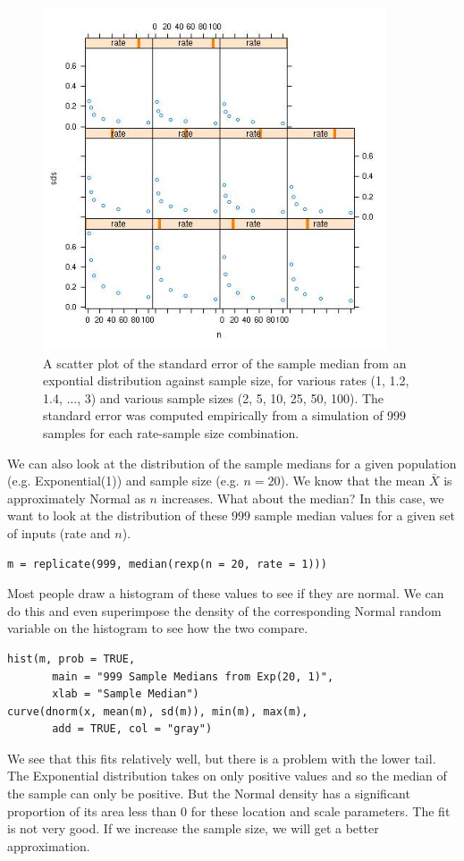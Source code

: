 \begin{figure}[htbp]
  \begin{center}
    \leavevmode
     \includegraphics[width=4in]{RNG/images/medianSDpanel.jpg}    
     \caption{A scatter plot of the standard error of the sample
       median from an expontial distribution against sample size, for
       various rates (1, 1.2, 1.4, $\ldots$, 3) and various sample
       sizes (2, 5, 10, 25, 50, 100).  The standard error was computed
       empirically from a simulation of 999 samples for each
       rate-sample size combination.}
    \label{fig:medianSD}
  \end{center}
\end{figure}

We can also look at the distribution of the sample medians for a given
population (e.g. Exponential(1)) and sample size (e.g. $n = 20$).  We
know that the mean $\bar{X}$ is approximately Normal as $n$
increases. What about the median?  In this case, we want to look at
the distribution of these $999$ sample median values for a given set
of inputs (rate and $n$).
\begin{verbatim}
m = replicate(999, median(rexp(n = 20, rate = 1)))
\end{verbatim}
Most people draw a histogram of these values
to see if they are normal.
We can do this and even superimpose the
density of the corresponding  Normal random variable
on the histogram to see how the two compare.
\begin{verbatim}
hist(m, prob = TRUE, 
       main = "999 Sample Medians from Exp(20, 1)",
       xlab = "Sample Median")
curve(dnorm(x, mean(m), sd(m)), min(m), max(m), 
       add = TRUE, col = "gray")
\end{verbatim}
We see that this fits relatively well, but there is a problem with
the lower tail. The Exponential distribution takes on only positive
values and so the median of the sample can only be positive.
But the Normal density has a significant proportion of
its area less than $0$ for these location and scale parameters.
The fit is not very good.
If we increase the sample size, we will get a better approximation.

